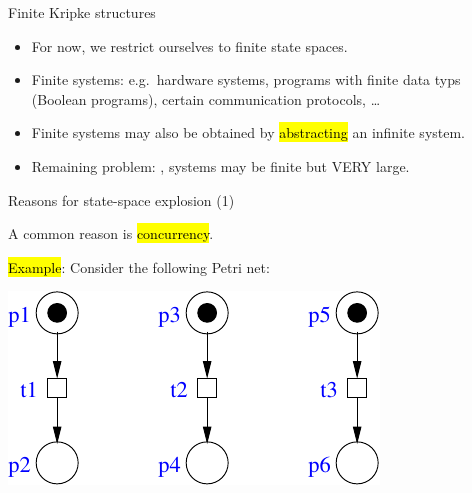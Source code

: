 \begin{frame}{Finite Kripke structures}
\begin{itemize}
\itemsep1em
\item For now, we restrict ourselves to finite state spaces.

\item Finite systems: e.g.\ hardware systems, programs with finite
   data typs (Boolean programs), certain communication protocols, \ldots

\item Finite systems may also be obtained by \hl{abstracting} an
   infinite system.

\item Remaining problem: ,
   systems may be finite but VERY large.   
\end{itemize}
\end{frame}


\begin{frame}{Reasons for state-space explosion (1)}

A common reason is \hl{concurrency}.

\bigskip
\hl{Example}: Consider the following Petri net:

\bigskip
\begin{center}
\includegraphics[width=.8\textwidth]{content/chapter_model_checking/model_checking/images/3prozesse}
\end{center}

\end{frame}


